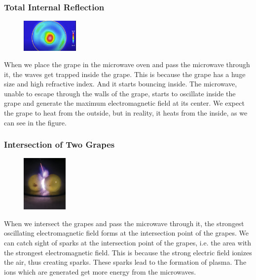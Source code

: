 \documentclass{article}
\begin{document}
\subsubsection{\Large Total Internal Reflection}

\begin{figure}
    
    \includegraphics[width=0.25\textwidth]{Image-3.png}
   
\end{figure}
\Large
When we place the grape in the microwave oven and pass the microwave through it, the waves get trapped inside the grape. This is because the grape has a huge size and high refractive index.
And it starts bouncing inside. The microwave, unable to escape through the walls of the grape, starts to oscillate inside the grape and generate the maximum electromagnetic field at its center.
We expect the grape to heat from the outside, but in reality, it heats from the inside, as we can see in the figure.
\subsubsection{\Large Intersection of Two Grapes}

\begin{figure}
    
    \includegraphics[width=0.2\textwidth]{m_96_1_f1.jpg}
   
\end{figure}
\Large

When we intersect the grapes and pass the microwave through it, the strongest oscillating electromagnetic field forms at the intersection point of the grapes.
We can catch sight of sparks at the intersection point of the grapes, i.e. the area with the strongest electromagnetic field. This is because the strong electric field ionizes the air, thus creating sparks. These sparks lead to the formation of plasma. The ions which are generated get more energy from the microwaves.
\end{document}
